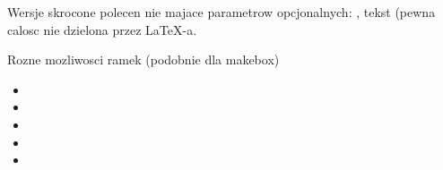 \documentclass[12pt]{article}
\begin{document}
Wersje skrocone polecen nie majace parametrow opcjonalnych:
, \mbox{tekst} (pewna calosc nie dzielona przez LaTeX-a.

Rozne mozliwosci ramek (podobnie dla makebox)
\begin{itemize}
\item {}
\item {}
\item {}
\item {}
\item {}
\end{itemize}
\end{document}

